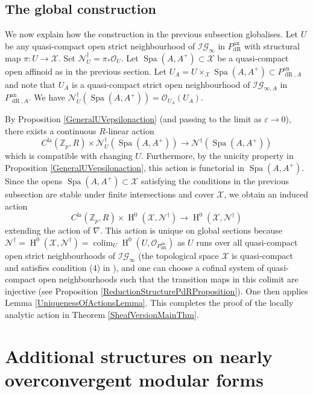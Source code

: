 \documentclass[10pt, oneside]{amsart}
\numberwithin{equation}{subsection}
\theoremstyle{definition}
\theoremstyle{remark}
\newcommand{\mbb}[1]{\mathbb{#1}}
\newcommand{\opn}[1]{\operatorname{#1}}
\begin{document}
\subsection{The global construction}

We now explain how the construction in the previous subsection globalises. Let $U$ be any quasi-compact open strict neighbourhood of $\mathcal{IG}_{\infty}$ in $P_{\opn{dR}}^{\opn{an}}$ with structural map $\pi \colon U \to \mathcal{X}$. Set $\mathcal{N}^{\dagger}_U = \pi_* \mathcal{O}_U$. Let $\opn{Spa}(A, A^+) \subset \mathcal{X}$ be a quasi-compact open affinoid as in the previous section. Let $U_A = U \times_{\mathcal{X}} \opn{Spa}(A, A^+) \subset P_{\opn{dR}, A}^{\opn{an}}$ and note that $U_A$ is a quasi-compact strict open neighbourhood of $\mathcal{IG}_{\infty, A}$ in $P_{\opn{dR}, A}^{\opn{an}}$. We have $\mathcal{N}^{\dagger}_{U}(\opn{Spa}(A, A^+)) = \mathcal{O}_{U_A}(U_A)$.

By Proposition \ref{GeneralUVepsilonaction} (and passing to the limit as $\varepsilon \to 0$), there exists a continuous $R$-linear action
\[
C^{\opn{la}}(\mbb{Z}_p, R) \times \mathcal{N}^{\dagger}_{U}(\opn{Spa}(A, A^+)) \to \mathcal{N}^{\dagger}(\opn{Spa}(A, A^+))
\]
which is compatible with changing $U$. Furthermore, by the unicity property in Proposition \ref{GeneralUVepsilonaction}, this action is functorial in $\opn{Spa}(A, A^+)$. Since the opens $\opn{Spa}(A, A^+) \subset \mathcal{X}$ satisfying the conditions in the previous subsection are stable under finite intersections and cover $\mathcal{X}$, we obtain an induced action
\[
C^{\opn{la}}(\mbb{Z}_p, R) \times \opn{H}^0(\mathcal{X}, \mathcal{N}^{\dagger}) \to \opn{H}^0(\mathcal{X}, \mathcal{N}^{\dagger})
\]
extending the action of $\nabla$. This action is unique on global sections because $\mathscr{N}^{\dagger} = \opn{H}^0(\mathcal{X}, \mathcal{N}^{\dagger}) = \opn{colim}_U \opn{H}^0(U, \mathcal{O}_{P_{\opn{dR}}^{\opn{an}}})$ as $U$ runs over all quasi-compact open strict neighbourhoods of $\mathcal{IG}_{\infty}$ (the topological space $\mathcal{X}$ is quasi-compact and satisfies condition (4) in \cite[Tag 009F]{stacks-project}), and one can choose a cofinal system of quasi-compact open neighbourhoods such that the transition maps in this colimit are injective (see Proposition \ref{ReductionStructurePdRProposition}). One then applies Lemma \ref{UniquenessOfActionsLemma}. This completes the proof of the locally analytic action in Theorem \ref{SheafVersionMainThm}.

\section{Additional structures on nearly overconvergent modular forms} \label{AdditionalStructuresSection}
\end{document}
